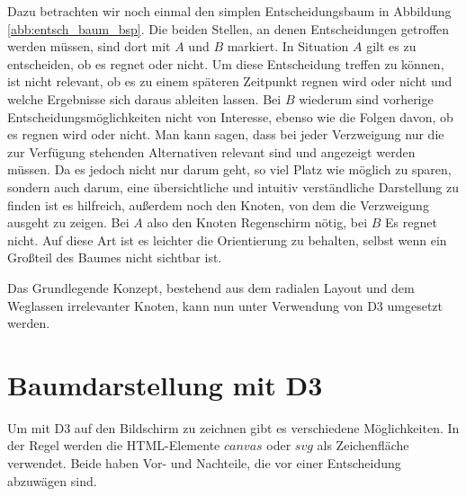 Dazu betrachten wir noch einmal den simplen Entscheidungsbaum in Abbildung \ref{abb:entsch_baum_bsp}. Die beiden Stellen, an denen Entscheidungen getroffen werden müssen, sind dort mit $A$ und $B$ markiert. In Situation $A$ gilt es zu entscheiden, ob es regnet oder nicht. Um diese Entscheidung treffen zu können, ist nicht relevant, ob es zu einem späteren Zeitpunkt regnen wird oder nicht und welche Ergebnisse sich daraus ableiten lassen. Bei $B$ wiederum sind vorherige Entscheidungsmöglichkeiten nicht von Interesse, ebenso wie die Folgen davon, ob es regnen wird oder nicht. Man kann sagen, dass bei jeder Verzweigung nur die zur Verfügung stehenden Alternativen relevant sind und angezeigt werden müssen. Da es jedoch nicht nur darum geht, so viel Platz wie möglich zu sparen, sondern auch darum, eine übersichtliche und intuitiv verständliche Darstellung zu finden ist es hilfreich, außerdem noch den Knoten, von dem die Verzweigung ausgeht zu zeigen. Bei $A$ also den Knoten \glqq Regenschirm nötig\grqq , bei $B$ \glqq Es regnet nicht\grqq . Auf diese Art ist es leichter die Orientierung zu behalten, selbst wenn ein Großteil des Baumes nicht sichtbar ist.

Das Grundlegende Konzept, bestehend aus dem radialen Layout und dem Weglassen irrelevanter Knoten, kann nun unter Verwendung von D3 umgesetzt werden.

\section{Baumdarstellung mit D3}

Um mit D3 auf den Bildschirm zu zeichnen gibt es verschiedene Möglichkeiten. In der Regel werden die HTML-Elemente $canvas$ oder $svg$ als Zeichenfläche verwendet. Beide haben Vor- und Nachteile, die vor einer Entscheidung abzuwägen sind.

